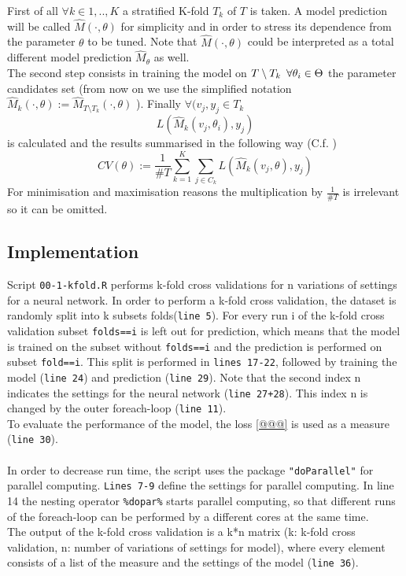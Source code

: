 \documentclass[a4paper,12pt]{article}
\begin{document}
First of all $\forall k \in 1, ..,K$ a stratified K-fold $T_{k}$ of $T$ is taken. A model prediction will be called $ \hat{M}(\cdot,\theta)$ for simplicity and in order to stress its dependence from the parameter $\theta$ to be tuned.
Note that $\hat{M}(\cdot,\theta)$ could be interpreted as a total different model prediction $\hat{M}_{\theta}$ as well.\\
The second step consists in training the model on $T \setminus T_{k} \enskip \forall \theta_{i} \in \Theta $ the parameter candidates set (from now on we use the simplified notation $ \hat{M}_{k}(\cdot,\theta):=\hat{M}_{T \setminus T_{k}}(\cdot,\theta)$ ).
Finally $\forall (v_{j},y_{j} \in T_{k} $  $$ L(\hat{M}_{k}(v_{j},\theta_{i}),y_{j})$$ is calculated and the results summarised in the following way (C.f. \cite{tibshirani2009} ) $$ CV(\theta):= \frac{1}{\#T} \sum_{k=1}^{K} \sum_{j \in C_{k}} L(\hat{M}_{k}(v_{j},\theta),y_{j})$$
For minimisation and maximisation reasons the multiplication by $\frac{1}{\# T}$ is irrelevant so it can be omitted.

\subsection{Implementation}


Script \texttt{00-1-kfold.R} performs k-fold cross validations for n variations of settings for a neural network. In order to perform a k-fold cross validation, the dataset is randomly split into k subsets folds(\texttt{line 5}). For every run i of the k-fold cross validation subset \texttt{folds==i} is left out for prediction, which means that the model is trained on the subset without \texttt{folds==i} and the prediction is performed on subset \texttt{fold==i}. This split is performed in \texttt{lines 17-22}, followed by training the model (\texttt{line 24}) and prediction (\texttt{line 29}). Note that the second index n indicates the settings for the neural network (\texttt{line 27+28}). This index n is changed by the outer foreach-loop (\texttt{line 11}). \\
To evaluate the performance of the model, the loss \ref{@@@} is used as a measure (\texttt{line 30}). \\
\\
In order to decrease run time, the script uses the package \texttt{"doParallel"} for parallel computing. \texttt{Lines 7-9} define the settings for parallel computing. In line 14 the nesting operator \texttt{\%dopar\%} starts parallel computing, so that different runs of the foreach-loop can be performed by a different cores at the same time.\\ 
The output of the k-fold cross validation is a k*n matrix (k: k-fold cross validation, n: number of variations of settings for model), where every element consists of a list  of the measure and the settings of the model (\texttt{line 36}). \\
\end{document}
